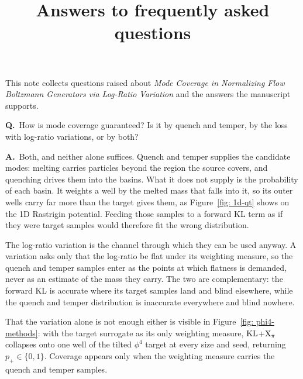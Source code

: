 \documentclass[11pt]{article}
\title{Answers to frequently asked questions}
\author{}
\date{}
\newcounter{qa}
\newcommand{\QA}[2]{%
  \par\bigskip
  \noindent\textbf{Q\theqa.}~#1\par
  \medskip
  \noindent\textbf{A\theqa.}~#2\par
  \medskip
}
\newcommand{\Q}[1]{\refstepcounter{qa}\QA{#1}}
\begin{document}
\maketitle

\noindent
This note collects questions raised about
\emph{Mode Coverage in Normalizing Flow Boltzmann Generators via Log-Ratio
Variation} and the answers the manuscript supports.

\Q{How is mode coverage guaranteed? Is it by quench and temper, by the loss
with log-ratio variations, or by both?}
{Both, and neither alone suffices. Quench and temper supplies the candidate
modes: melting carries particles beyond the region the source covers, and
quenching drives them into the basins. What it does not supply is the
probability of each basin. It weights a well by the melted mass that falls into
it, so its outer wells carry far more than the target gives them, as
Figure~\ref{fig: 1d-qt} shows on the 1D Rastrigin potential. Feeding those
samples to a forward KL term as if they were target samples would therefore fit
the wrong distribution.

The log-ratio variation is the channel through which they can be used anyway. A
variation asks only that the log-ratio be flat under its weighting measure, so
the quench and temper samples enter as the points at which flatness is demanded,
never as an estimate of the mass they carry. The two are complementary: the
forward KL is accurate where its target samples land and blind elsewhere, while
the quench and temper distribution is inaccurate everywhere and blind nowhere.

That the variation alone is not enough either is visible in
Figure~\ref{fig: phi4-methods}: with the target surrogate as its only weighting
measure, $\mathrm{KL}$+$\mathrm{X}_\pi$ collapses onto one well of the tilted $\phi^4$ target at
every size and seed, returning $p_+\in\{0,1\}$. Coverage appears only when the
weighting measure carries the quench and temper samples.}
\end{document}
